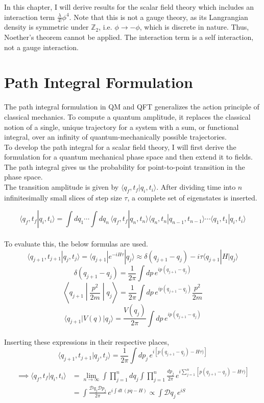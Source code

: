 In this chapter, I will derive results for the scalar field theory which includes an interaction term $\frac{\lambda}{4!}\phi^4$. Note that this is not a gauge theory, as its Langrangian density is symmetric under $\mathbb{Z}_2$, i.e. $\phi\rightarrow -\phi$, which is discrete in nature. Thus, Noether's theorem cannot be applied. The interaction term is a self interaction, not a gauge interaction.

\section{Path Integral Formulation}
The path integral formulation in QM and QFT generalizes the action principle of classical mechanics. To compute a quantum amplitude, it replaces the classical notion of a single, unique trajectory for a system with a sum, or functional integral, over an infinity of quantum-mechanically possible trajectories.\\

\noindent To develop the path integral for a scalar field theory, I will first derive the formulation for a quantum mechanical phase space and then extend it to fields. The path integral gives us the probability for point-to-point transition in the phase space.\\ 

\noindent The transition amplitude is given by $\langle q_f,t_f|q_i,t_i\rangle$. After dividing time into $n$ infinitesimally small slices of step size $\tau$, a complete set of eigenstates is inserted.

$$\langle q_f,t_f|q_i,t_i\rangle=\int dq_1\cdots\int dq_n\, \langle q_f,t_f|q_n,t_n\rangle\langle q_n,t_n|q_{n-1},t_{n-1}\rangle\cdots\langle q_1,t_1|q_i,t_i\rangle$$\\

\noindent To evaluate this, the below formulas are used.
$$\langle q_{j+1},t_{j+1}|q_j,t_j\rangle=\langle q_{j+1}|e^{-iH\tau}|q_j\rangle\approx\delta(q_{j+1}-q_j)-i\tau\langle q_{j+1}|H|q_j\rangle$$
$$\delta(q_{j+1}-q_j)=\frac{1}{2\pi}\int dp\, e^{ip(q_{j+1}-q_j)}$$
$$\left\langle q_{j+1}\middle|\frac{p^2}{2m}\middle|q_j\right\rangle=\frac{1}{2\pi}\int dp\, e^{ip(q_{j+1}-q_j)} \frac{p^2}{2m}$$
$$\langle q_{j+1}|V(q)|q_j\rangle=\frac{V(q_j)}{2\pi}\int dp\, e^{ip(q_{j+1}-q_j)}$$\\

\noindent Inserting these expressions in their respective places, 
$$\langle q_{j+1},t_{j+1}|q_j,t_j\rangle=\frac{1}{2\pi}\int dp_j\, e^{i[p(q_{j+1}-q_j)-H\tau)]}$$
\begin{align*}
    \begin{split}
        \implies\langle q_f,t_f|q_i,t_i\rangle&=\lim_{n\to\infty}\int\prod_{j=1}^{n}dq_j\int\prod_{j=1}^{n}\frac{dp_j}{2\pi}\, e^{i\sum_{j=1}^{n}[p(q_{j+1}-q_j)-H\tau)]}\\
        &=\int\frac{\mathcal{D}q_j\mathcal{D}p_j}{2\pi}\, e^{i\int dt\, (p\dot q-H)}\propto\int\mathcal{D}q_j\, e^{iS}
    \end{split}
\end{align*}

